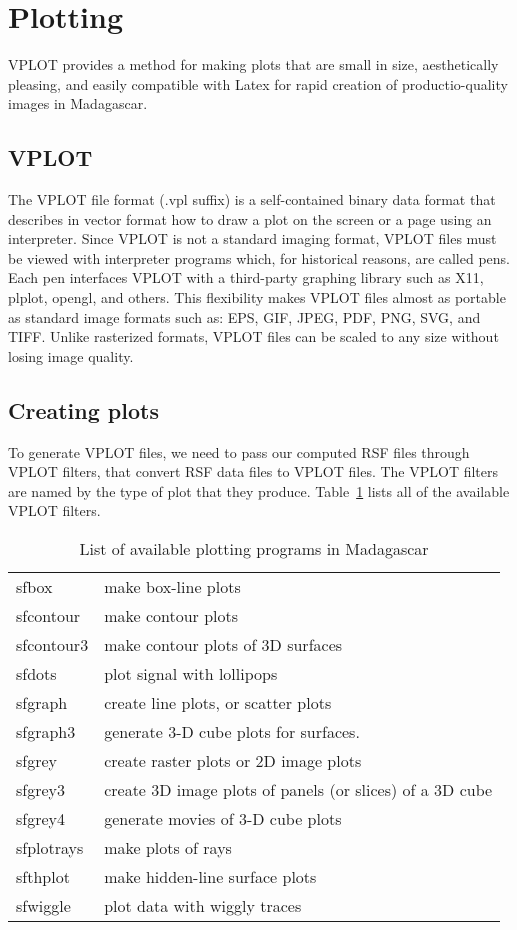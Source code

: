 \section{Plotting}

VPLOT provides a method for making plots that are small in size, aesthetically pleasing, and easily compatible with Latex for rapid creation of productio-quality images in Madagascar.

\subsection{VPLOT}
The VPLOT file format (.vpl suffix) is a self-contained binary data
format that describes in vector format how to draw a plot on the
screen or a page using an interpreter. Since VPLOT is not a standard
imaging format, VPLOT files must be viewed with 
interpreter programs which, for historical reasons, are called pens. Each pen interfaces VPLOT with a
third-party graphing library such as X11, plplot, opengl, and
others. This flexibility makes VPLOT files almost as portable as
standard image formats such as: EPS, GIF, JPEG, PDF, PNG, SVG, and TIFF. Unlike rasterized
formats, VPLOT files can be scaled to any size without losing image
quality.

\subsection{Creating plots}
To generate VPLOT files, we need to pass our computed RSF files through VPLOT filters, that convert RSF data files to VPLOT files. The VPLOT filters are named by the type of plot that they produce. Table~\ref{table:plotting} lists all of the available VPLOT filters.

\begin{table}
\begin{tabularx}{\textwidth}{|l|X|}
    \hline 
sfbox & make box-line plots \\
sfcontour & make contour plots \\
sfcontour3 & make contour plots of 3D surfaces \\
sfdots   & plot signal with lollipops \\
sfgraph & create line plots, or scatter plots \\
sfgraph3 & generate 3-D cube plots for surfaces. \\
sfgrey & create raster plots or 2D image plots \\
sfgrey3 & create 3D image plots of panels (or slices) of a 3D cube \\
sfgrey4 & generate movies of 3-D cube plots \\ 
sfplotrays & make plots of rays \\
sfthplot & make hidden-line surface plots \\
sfwiggle & plot data with wiggly traces \\
\hline 
\end{tabularx}
    \caption{List of available plotting programs in Madagascar}
    \label{table:plotting}
\end{table}

